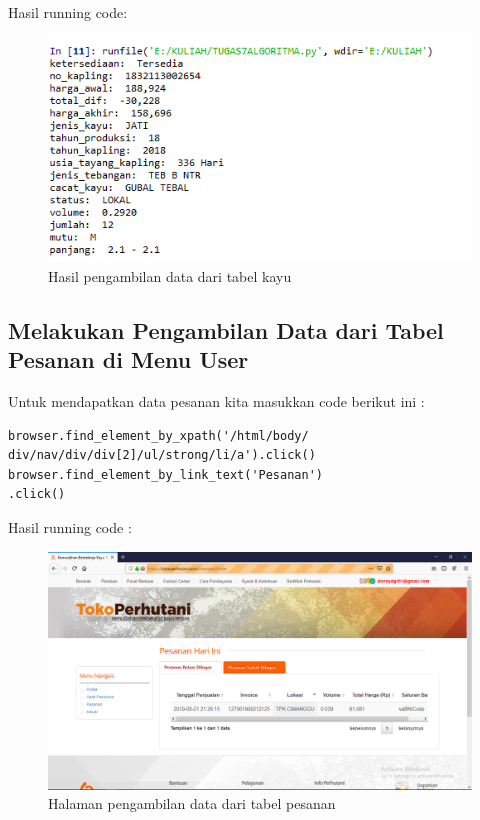 Hasil running code:
\begin{figure}[h]
	\centering
	\includegraphics[scale=0.6]{figures/782}
	\caption{Hasil pengambilan data dari tabel kayu}
\end{figure}

\newpage
\subsection{Melakukan Pengambilan Data dari Tabel Pesanan di Menu User}
Untuk mendapatkan data pesanan kita masukkan code berikut ini :
\begin{verbatim}
browser.find_element_by_xpath('/html/body/
div/nav/div/div[2]/ul/strong/li/a').click()
browser.find_element_by_link_text('Pesanan')
.click()
\end{verbatim}

Hasil running code :
\begin{figure}[h]
	\centering
	\includegraphics[scale=0.25]{figures/783}
	\caption{Halaman pengambilan data dari tabel pesanan}
\end{figure}


